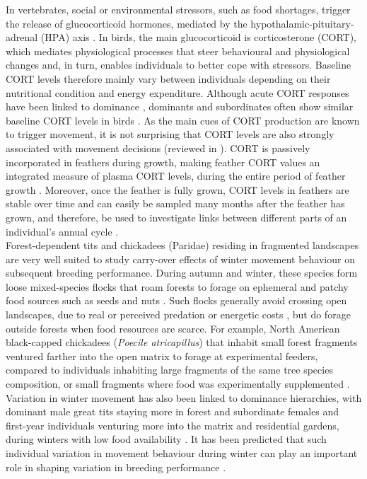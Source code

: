 \documentclass[10pt, twoside]{book} %
\begin{document}
In vertebrates, social or environmental stressors, such as food shortages, trigger the release of glucocorticoid hormones, mediated by the hypothalamic-pituitary-adrenal (HPA) axis \citep{Wingfield2013, Creel2013}. In birds, the main glucocorticoid is corticosterone (CORT), which mediates physiological processes that steer behavioural and physiological changes and, in turn, enables individuals to better cope with stressors. Baseline CORT levels therefore mainly vary between individuals depending on their nutritional condition and energy expenditure. Although acute CORT responses have been linked to dominance \citep{Pravosudov2003}, dominants and subordinates often show similar baseline CORT levels in birds \citep{Creel2013}. As the main cues of CORT production are known to trigger movement, it is not surprising that CORT levels are also strongly associated with movement decisions (reviewed in \citealt{Goossens2020}). CORT is passively incorporated in feathers during growth, making feather CORT values an integrated measure of plasma CORT levels, during the entire period of feather growth \citep{Bortolotti2008, Romero2016}. Moreover, once the feather is fully grown, CORT levels in feathers are stable over time and can easily be sampled many months after the feather has grown, and therefore, be used to investigate links between different parts of an individual's annual cycle \citep{Bortolotti2010}.\\

Forest-dependent tits and chickadees (Paridae) residing in fragmented landscapes are very well suited to study carry-over effects of winter movement behaviour on subsequent breeding performance. During autumn and winter, these species form loose mixed-species flocks that roam forests to forage on ephemeral and patchy food sources such as seeds and nuts \citep{Ekman1989, Farine2012}. Such flocks generally avoid crossing open landscapes, due to real or perceived predation or energetic costs \citep{Hinsley2000, Rodriguez2001}, but do forage outside forests when food resources are scarce. For example, North American black-capped chickadees (\textit{Poecile atricapillus}) that inhabit small forest fragments ventured farther into the open matrix to forage at experimental feeders, compared to individuals inhabiting large fragments of the same tree species composition, or small fragments where food was experimentally supplemented \citep{Turcotte2003}. Variation in winter movement has also been linked to dominance hierarchies, with dominant male great tits staying more in forest and subordinate females and first-year individuals venturing more into the matrix and residential gardens, during winters with low food availability \citep{Gosler1987}. It has been predicted that such individual variation in movement behaviour during winter can play an important role in shaping variation in breeding performance \citep{Montreuil-Spencer2019}.\\
\end{document}
